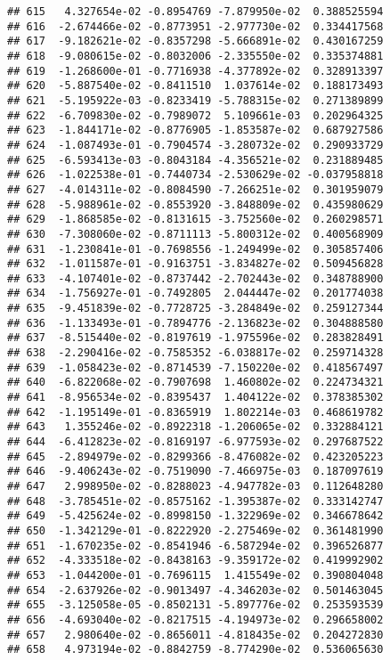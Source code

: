 \documentclass[
]{article}
\begin{document}
\begin{verbatim}
## 615   4.327654e-02 -0.8954769 -7.879950e-02  0.388525594
## 616  -2.674466e-02 -0.8773951 -2.977730e-02  0.334417568
## 617  -9.182621e-02 -0.8357298 -5.666891e-02  0.430167259
## 618  -9.080615e-02 -0.8032006 -2.335550e-02  0.335374881
## 619  -1.268600e-01 -0.7716938 -4.377892e-02  0.328913397
## 620  -5.887540e-02 -0.8411510  1.037614e-02  0.188173493
## 621  -5.195922e-03 -0.8233419 -5.788315e-02  0.271389899
## 622  -6.709830e-02 -0.7989072  5.109661e-03  0.202964325
## 623  -1.844171e-02 -0.8776905 -1.853587e-02  0.687927586
## 624  -1.087493e-01 -0.7904574 -3.280732e-02  0.290933729
## 625  -6.593413e-03 -0.8043184 -4.356521e-02  0.231889485
## 626  -1.022538e-01 -0.7440734 -2.530629e-02 -0.037958818
## 627  -4.014311e-02 -0.8084590 -7.266251e-02  0.301959079
## 628  -5.988961e-02 -0.8553920 -3.848809e-02  0.435980629
## 629  -1.868585e-02 -0.8131615 -3.752560e-02  0.260298571
## 630  -7.308060e-02 -0.8711113 -5.800312e-02  0.400568909
## 631  -1.230841e-01 -0.7698556 -1.249499e-02  0.305857406
## 632  -1.011587e-01 -0.9163751 -3.834827e-02  0.509456828
## 633  -4.107401e-02 -0.8737442 -2.702443e-02  0.348788900
## 634  -1.756927e-01 -0.7492805  2.044447e-02  0.201774038
## 635  -9.451839e-02 -0.7728725 -3.284849e-02  0.259127344
## 636  -1.133493e-01 -0.7894776 -2.136823e-02  0.304888580
## 637  -8.515440e-02 -0.8197619 -1.975596e-02  0.283828491
## 638  -2.290416e-02 -0.7585352 -6.038817e-02  0.259714328
## 639  -1.058423e-02 -0.8714539 -7.150220e-02  0.418567497
## 640  -6.822068e-02 -0.7907698  1.460802e-02  0.224734321
## 641  -8.956534e-02 -0.8395437  1.404122e-02  0.378385302
## 642  -1.195149e-01 -0.8365919  1.802214e-03  0.468619782
## 643   1.355246e-02 -0.8922318 -1.206065e-02  0.332884121
## 644  -6.412823e-02 -0.8169197 -6.977593e-02  0.297687522
## 645  -2.894979e-02 -0.8299366 -8.476082e-02  0.423205223
## 646  -9.406243e-02 -0.7519090 -7.466975e-03  0.187097619
## 647   2.998950e-02 -0.8288023 -4.947782e-03  0.112648280
## 648  -3.785451e-02 -0.8575162 -1.395387e-02  0.333142747
## 649  -5.425624e-02 -0.8998150 -1.322969e-02  0.346678642
## 650  -1.342129e-01 -0.8222920 -2.275469e-02  0.361481990
## 651  -1.670235e-02 -0.8541946 -6.587294e-02  0.396526877
## 652  -4.333518e-02 -0.8438163 -9.359172e-02  0.419992902
## 653  -1.044200e-01 -0.7696115  1.415549e-02  0.390804048
## 654  -2.637926e-02 -0.9013497 -4.346203e-02  0.501463045
## 655  -3.125058e-05 -0.8502131 -5.897776e-02  0.253593539
## 656  -4.693040e-02 -0.8217515 -4.194973e-02  0.296658002
## 657   2.980640e-02 -0.8656011 -4.818435e-02  0.204272830
## 658   4.973194e-02 -0.8842759 -8.774290e-02  0.536065630

\end{verbatim}
\end{document}
